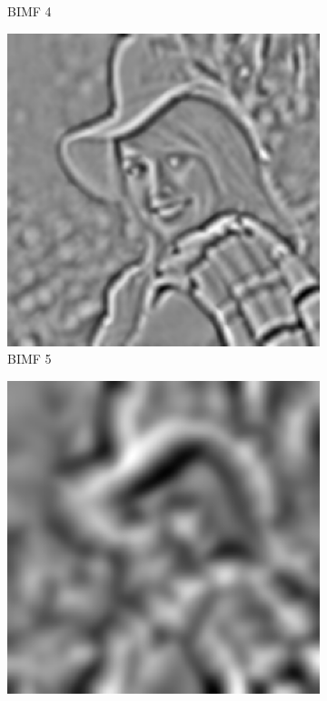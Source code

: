\begin{figure}
\begin{subfigure}{.30\textwidth}
  \caption{BIMF 4}
\end{subfigure}
\begin{subfigure}{.30\textwidth}
  \centering
  \includegraphics[width=.9\linewidth]{img/e_1_1_5}
  \caption{BIMF 5}
\end{subfigure}
\begin{subfigure}{.30\textwidth}
  \centering
  \includegraphics[width=.9\linewidth]{img/e_1_1_20}

\end{subfigure}
\end{figure}
